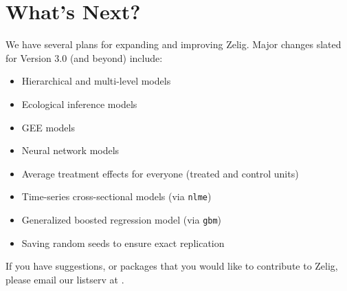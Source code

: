 \section{What's Next?}

We have several plans for expanding and improving Zelig.  Major
changes slated for Version 3.0 (and beyond) include:  

\begin{itemize}
\item Hierarchical and multi-level models
\item Ecological inference models
\item GEE models
\item Neural network models
\item Average treatment effects for everyone (treated and control
units)
\item Time-series cross-sectional models (via {\tt nlme})
\item Generalized boosted regression model (via {\tt gbm})
\item Saving random seeds to ensure exact replication
\end{itemize}

If you have suggestions, or packages that you would like to contribute
to Zelig, please email our listserv at .







